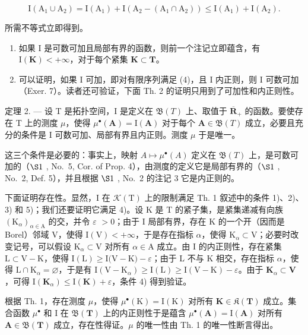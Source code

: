 \[
\mathrm{I} \left(\mathrm{A} _ {1} \cup \mathrm{A} _ {2}\right) = \mathrm{I} \left(\mathrm{A} _ {1}\right) + \mathrm{I} \left(\mathrm{A} _ {2} - \left(\mathrm{A} _ {1} \cap \mathrm{A} _ {2}\right)\right) \leqslant \mathrm{I} \left(\mathrm{A} _ {1}\right) + \mathrm{I} \left(\mathrm{A} _ {2}\right).
\]

所需不等式立即得到。

\begin{enumerate}
\def\labelenumi{\arabic{enumi})}
\setcounter{enumi}{3}
\item
  如果 I 是可数可加且局部有界的函数，则前一个注记立即蕴含，有 \(\mathrm{I}(\mathbf{K}) < +\infty\)，对于每个紧集 \(\mathbf{K} \subset \mathbf{T}\)。
\item
  可以证明，如果 I 可加，即对有限序列满足 (4)，且 I 内正则，则 I 可数可加（Exer. 7）。读者还可验证，下面 Th. 2 的证明只用到了可加性和内正则性。
\end{enumerate}

定理 2. --- 设 T 是拓扑空间，I 是定义在 \(\mathfrak{B}(T)\) 上、取值于 \(\overline{\mathbf{R}}_{+}\) 的函数。要使存在 T 上的测度 \(\mu\)，使得 \(\mu^{\bullet}(\mathbf{A}) = \mathrm{I}(\mathbf{A})\) 对于每个 \(\mathbf{A} \in \mathfrak{B}(T)\) 成立，必要且充分的条件是 I 可数可加、局部有界且内正则。测度 \(\mu\) 于是唯一。

这三个条件是必要的：事实上，映射 \(A \mapsto \mu^{\bullet}(A)\) 定义在 \(\mathfrak{B}(T)\) 上，是可数可加的（\(\S1\) , No.~5, Cor. of Prop. 4），由测度的定义它是局部有界的（\(\S1\) , No.~2, Def. 5），并且根据 \(\S1\) , No.~2 的注记 3 它是内正则的。

下面证明存在性。显然，I 在 \(\mathcal{K}(\mathrm{T})\) 上的限制满足 Th. 1 叙述中的条件 1)、2)、3) 和 5)；我们还要证明它满足 4)。设 K 是 T 的紧子集，是紧集递减有向族 \((\mathrm{K}_{\alpha})_{\alpha \in \mathrm{A}}\) 的交，并令 \(\varepsilon\) \(>0\)；由于 I 局部有界，存在 K 的一个开（因而是 Borel）邻域 V，使得 \(\mathrm{I(V)} < +\infty\)，于是存在指标 \(\alpha\)，使得 \(\mathrm{K}_{\alpha} \subset \mathrm{V}\)；必要时改变记号，可以假设 \(\mathrm{K}_{\alpha} \subset \mathrm{V}\) 对所有 \(\alpha \in \mathrm{A}\) 成立。由 I 的内正则性，存在紧集 \(\mathrm{L} \subset \mathrm{V} - \mathrm{K}\)，使得 \(\mathrm{I(L)} \geqslant \mathrm{I(V} - \mathrm{K)} - \varepsilon\)；由于 L 不与 K 相交，存在指标 \(\alpha\)，使得 \(\mathrm{L} \cap \mathrm{K}_{\alpha} = \varnothing\)，于是有 \(\mathrm{I}(\mathrm{V} - \mathrm{K}_{\alpha}) \geqslant \mathrm{I}(\mathrm{L}) \geqslant \mathrm{I}(\mathrm{V} - \mathrm{K}) - \varepsilon\)。由于 \(\mathbf{K}_{\alpha} \subset \mathbf{V}\)，可得 \(\mathrm{I}(\mathbf{K}_{\alpha}) \leqslant \mathrm{I}(\mathbf{K}) + \varepsilon\)，条件 4) 得到验证。

根据 Th. 1，存在测度 \(\mu\)，使得 \(\mu^{\bullet}(\mathrm{K}) = \mathrm{I}(\mathrm{K})\) 对所有 \(\mathbf{K} \in \mathfrak{K}(\mathbf{T})\) 成立。集合函数 \(\mu^{\bullet}\) 和 I 在 \(\mathfrak{B}(\mathbf{T})\) 上的内正则性于是蕴含 \(\mu^{\bullet}(\mathbf{A}) = \mathrm{I}(\mathbf{A})\) 对所有 \(\mathbf{A} \in \mathfrak{B}(\mathbf{T})\) 成立，存在性得证。\(\mu\) 的唯一性由 Th. 1 的唯一性断言得出。

